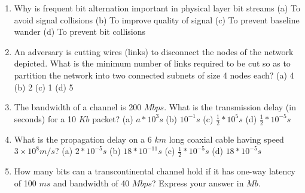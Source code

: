 \documentclass{article}
\begin{document}
\begin{enumerate}
            (c) $1 + \frac{m}{n}$
            \newline
            (d) $1 + \frac{1}{m} + \frac{1}{n}$
        \item Why is frequent bit alternation important in physical layer bit streams
            \newline
            (a) To avoid signal collisions
            \newline
            (b) To improve quality of signal
            \newline
            (c) To prevent baseline wander
            \newline
            (d) To prevent bit collisions
        \item An adversary is cutting wires (links) to disconnect the nodes of the network depicted. What is the minimum number of links required to be cut so as to partition the network into two connected subnets of size 4 nodes each?
            \newline
            (a) 4
            \newline
            (b) 2
            \newline
            (c) 1
            \newline
            (d) 5
        \item The bandwidth of a channel is 200 $Mbps$. What is the transmission delay (in seconds) for a 10 $Kb$ packet?
            \newline
            (a) $a * 10^3 s$
            \newline
            (b) $10^{-1} s$
            \newline
            (c) $\frac{1}{2} * 10^5 s$
            \newline
            (d) $\frac{1}{2} * 10^{-5} s$
        \item What is the propagation delay on a 6 $km$ long coaxial cable having speed $3 \times 10^8m/s$?
            \newline
            (a) $2 * 10^{-5} s$
            \newline
            (b) $18 * 10^{-11} s$
            \newline
            (c) $\frac{1}{2} * 10^{-5} s$
            \newline
            (d) $18 * 10^{-5} s$
        \item How many bits can a transcontinental channel hold if it has one-way latency of 100 $ms$ and bandwidth of 40 $Mbps$? Express your answer in $Mb$.
            \newline

\end{enumerate}
\end{document}
